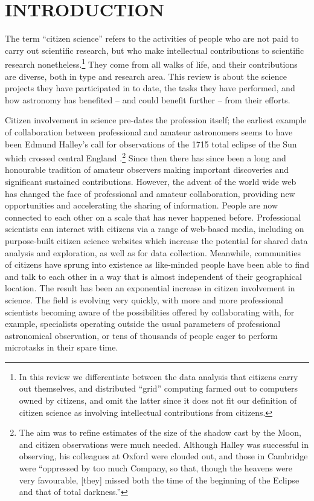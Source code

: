 \documentclass{ar2e}
\begin{document}

\section{INTRODUCTION}
\label{sec:intro}

The term ``citizen science'' refers to the activities of people who are not paid
to carry out scientific research, but who make intellectual contributions to
scientific research nonetheless.\footnote{In this review we differentiate
between the data analysis that citizens carry out themselves, and  distributed
``grid'' computing farmed out to computers owned by citizens, and omit the
latter since it does not fit our definition of citizen science as involving
intellectual  contributions from citizens.} They come from all walks of life,
and their contributions are diverse, both in type and research area. This review
is about the science projects they have participated in to date, the tasks they
have performed, and how astronomy has benefited -- and could benefit further --
from their efforts.

Citizen involvement in science pre-dates the profession itself; the earliest
example of collaboration between professional and amateur astronomers seems to
have been Edmund Halley's call for observations of the 1715 total eclipse of the
Sun which crossed central England \citep{Halley}.\footnote{The aim was to refine
estimates of the size of the shadow cast by the Moon, and citizen observations
were much needed. Although Halley was successful in observing, his colleagues at
Oxford were clouded out, and those in Cambridge were ``oppressed by too much
Company, so that, though the heavens were very favourable, [they] missed both
the time of the beginning of the Eclipse and that of total darkness.''}  Since
then there has since been a long and honourable tradition of amateur observers
making important discoveries and significant sustained contributions. However,
the advent of the world wide web has changed the face of professional and
amateur collaboration, providing new opportunities and accelerating the sharing
of information. People are now connected to each other on a scale that has never
happened before. Professional scientists can interact with citizens via a range
of web-based media, including on purpose-built citizen science websites which
increase the potential for shared data analysis and exploration, as well as for
data collection. Meanwhile, communities of citizens have sprung into existence
as like-minded people have been able to find and talk to each other in a way
that is almost independent of their geographical location. The result has been
an exponential increase in citizen involvement in science. The field is evolving
very quickly, with more and more professional scientists becoming aware of the
possibilities offered by collaborating with, for example, specialists operating
outside the usual parameters of professional astronomical observation, or tens
of thousands of people eager to perform microtasks in their spare time.  
\end{document}
